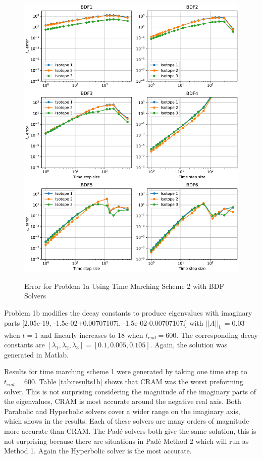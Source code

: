\begin{figure}[t]
  \centering
  \includegraphics[width=6.5in]{images/problem1aMethod2Int.png}\\
  \caption{Error for Problem 1a Using Time Marching Scheme 2 with BDF Solvers}
  \label{fig:errorProblem1aTimeMarchingScheme2Int}
\end{figure} 

\FloatBarrier



Problem 1b modifies the decay constants to produce eigenvalues with imaginary parts [2.05e-19, -1.5e-02+0.00707107i, -1.5e-02-0.00707107i] with $||A||_{l_{1}} = 0.03$ when $t=1$ and linearly increases to 18 when $t_{end} = 600.$ The corresponding decay constants are $[\lambda_{1}, \lambda_{2}, \lambda_{3}] = [0.1, 0.005, 0.105]$. Again, the solution was generated in Matlab. 

Results for time marching scheme 1 were generated by taking one time step to $t_{end} = 600$. Table \ref{tab:results1b} shows that CRAM was the worst preforming solver. This is not surprising considering the magnitude of the imaginary parts of the eigenvalues, CRAM is most accurate around the negative real axis. Both Parabolic and Hyperbolic solvers cover a wider range on the imaginary axis, which shows in the results. Each of these solvers are many orders of magnitude more accurate than CRAM. The Pad\'e solvers both give the same solution, this is not surprising because there are situations in Pad\'e Method 2 which will run as Method 1. Again the Hyperbolic solver is the most accurate.

